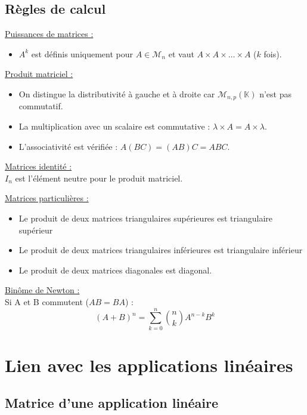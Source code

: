 	\subsection{Règles de calcul}

		\underline{Puissances de matrices :}
		\begin{itemize}
			\item $A^k$ est définis uniquement pour $A \in \mathcal{M}_{n}$ et vaut $A \times A \times \dots \times A$ ($k$ fois).\vspace{5pt}
		\end{itemize}

		\underline{Produit matriciel :}
		\begin{itemize}
			\item On distingue la distributivité à gauche et à droite car $\mathcal{M}_{n,p}(\mathbb{K})$ n'est pas commutatif.
			\item La multiplication avec un scalaire est commutative : $\lambda \times A = A \times \lambda$.
			\item L'associativité est vérifiée : $A(B C) = (A B) C = ABC$.\vspace{5pt}
		\end{itemize}

		\underline{Matrices identité :}\\
		$I_n$ est l'élément neutre pour le produit matriciel.\vspace{5pt}

		\underline{Matrices particulières :}
		\begin{itemize}
			\item Le produit de deux matrices triangulaires supérieures est triangulaire supérieur
			\item Le produit de deux matrices triangulaires inférieures est triangulaire inférieur
			\item Le produit de deux matrices diagonales est diagonal\vspace{5pt}.
		\end{itemize}

		\underline{Binôme de Newton :}\\
		Si A et B commutent ($AB = BA$) :
		\[ (A + B)^n = \sum_{k=0}^{n} \binom{n}{k} A^{n-k} B^k \]


\section{Lien avec les applications linéaires}

	\subsection{Matrice d'une application linéaire}

